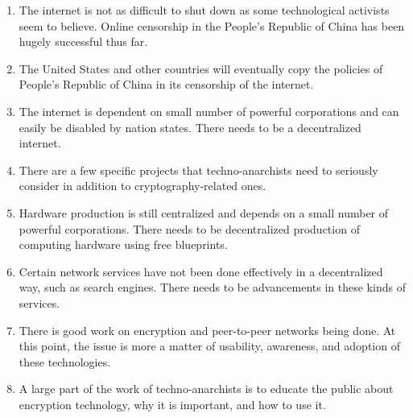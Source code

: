 \documentclass{article}
\begin{document}
\begin{enumerate}
\item The internet is not as difficult to shut down as some technological activists seem to believe. Online censorship in the People's Republic of China has been hugely successful thus far.
\item The United States and other countries will eventually copy the policies of People's Republic of China in its censorship of the internet.
\item The internet is dependent on small number of powerful corporations and can easily be disabled by nation states. There needs to be a decentralized internet.
\item There are a few specific projects that techno-anarchists need to seriously consider in addition to cryptography-related ones.
\item Hardware production is still centralized and depends on a small number of powerful corporations. There needs to be decentralized production of computing hardware using free blueprints.
\item Certain network services have not been done effectively in a decentralized way, such as search engines. There needs to be advancements in these kinds of services.
\item There is good work on encryption and peer-to-peer networks being done. At this point, the issue is more a matter of usability, awareness, and adoption of these technologies.
\item A large part of the work of techno-anarchists is to educate the public about encryption technology, why it is important, and how to use it.
\end{enumerate}
\end{document}
